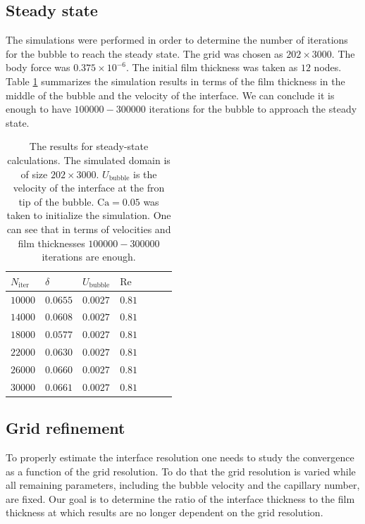 \documentclass[preprint,12pt]{elsarticle}
\newcommand{\Ca}{\mathrm{Ca}}
\renewcommand{\Re}{\mathrm{Re}}
\begin{document}
{\color{red}
\subsection{Steady state}
\label{sec:steady:state}
The simulations were performed in order to determine the number of iterations for the bubble to
reach the steady state. The grid was chosen as $202 \times 3000$. The body force was $0.375\times
10^{-6}$. The initial film thickness was taken as $12$ nodes. Table \ref{table:steady:state}
summarizes the simulation results in terms of the film thickness in the middle of the bubble and the
velocity of the interface. We can conclude it is enough to have $100000-300000$ iterations for
the bubble to approach the steady state.
\begin{table}
\begin{tabularx}{\textwidth}{|X|X|X|X|X|X|X|}
\hline
$N_\mathrm{iter}$&$\delta$&$U_{\mathrm{bubble}}$&{\color{red} $\Re$}\\
\hline
$10000$&$ 0.0655$&$0.0027$&$0.81$\\
\hline
$14000$&$0.0608$&$0.0027$&$0.81$\\
\hline
$18000$&$0.0577$&$0.0027$&$0.81$\\
\hline
$22000$&$0.0630$&$0.0027$&$0.81$\\
\hline
$26000$&$0.0660$&$0.0027$&$0.81$\\
\hline
$30000$&$0.0661$&$0.0027$&$0.81$\\
\hline
\end{tabularx}
\caption{The results for steady-state calculations. The simulated domain is
of size $202 \times 3000$. $U_{\mathrm{bubble}}$ is the velocity of the interface at the fron tip of
the bubble. $\Ca=0.05$ was taken to initialize the simulation. One can see that in terms of
velocities and film thicknesses $100000-300000$ iterations are enough.
\label{table:steady:state}}
\end{table}
}

\subsection{Grid refinement}
\label{section:grid:refinement}
To properly estimate the interface resolution one needs to study the convergence as a function of
the grid resolution. To do that the grid resolution is varied while all remaining parameters,
including the bubble velocity and the capillary number, are fixed.  Our goal is to determine the 
ratio of the interface thickness to the 
film thickness at which results are no longer dependent on the grid resolution.
\end{document}

